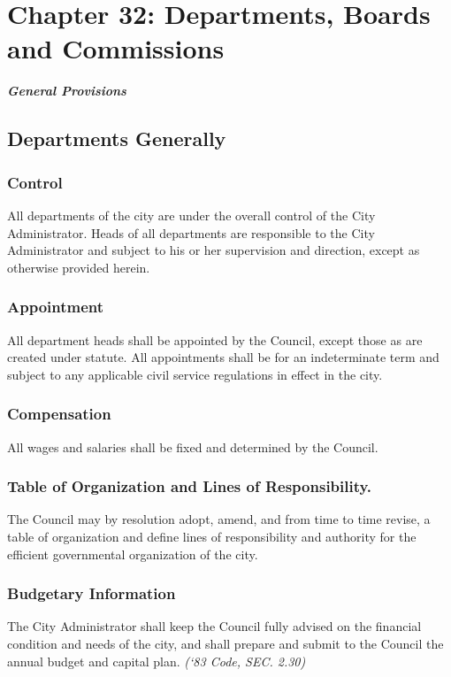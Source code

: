 %
\chapter*{Chapter 32: \newline
	Departments, Boards and Commissions}

\centerline{\textbf{\emph{\LARGE{General Provisions}}}}
\section{Departments Generally}
\subsection{Control}
All departments of the city are under the overall control of the City Administrator. Heads of all departments are responsible to the City Administrator and subject to his or her supervision and direction, except as otherwise provided herein.
\subsection{Appointment}
All department heads shall be appointed by the Council, except those as are created under statute. All appointments shall be for an indeterminate term and subject to any applicable civil service regulations in effect in the city.
\subsection{Compensation}
All wages and salaries shall be fixed and determined by the Council.
\subsection{Table of Organization and Lines of Responsibility.}
The Council may by resolution adopt, amend, and from time to time revise, a table of organization and define lines of responsibility and authority for the efficient governmental organization of the city.
\subsection{Budgetary Information}
The City Administrator shall keep the Council fully advised on the financial condition and needs of the city, and shall prepare and submit to the Council the annual budget and capital plan.\newline
\emph{(‘83 Code, SEC. 2.30)}

